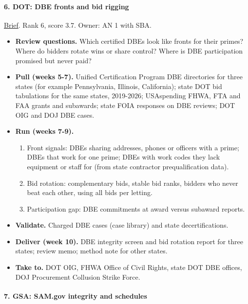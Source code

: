 \documentclass[letterpaper,11pt]{article}
\providecommand{\tightlist}{\setlength{\itemsep}{0pt}\setlength{\parskip}{0pt}}
\begin{document}
\hypertarget{dot-dbe-fronts-and-bid-rigging}{%
\paragraph{6. DOT: DBE fronts and bid
rigging}\label{dot-dbe-fronts-and-bid-rigging}}

\href{agencies/dot.pdf}{Brief}. Rank 6, score 3.7. Owner: AN 1 with SBA.

\begin{itemize}
\tightlist
\item
  \textbf{Review questions.} Which certified DBEs look like fronts for
  their primes? Where do bidders rotate wins or share control? Where is
  DBE participation promised but never paid?
\item
  \textbf{Pull (weeks 5-7).} Unified Certification Program DBE
  directories for three states (for example Pennsylvania, Illinois,
  California); state DOT bid tabulations for the same states, 2019-2026;
  USAspending FHWA, FTA and FAA grants and subawards; state FOIA
  responses on DBE reviews; DOT OIG and DOJ DBE cases.
\item
  \textbf{Run (weeks 7-9).}

  \begin{enumerate}
  \def\labelenumi{\arabic{enumi}.}
  \tightlist
  \item
    Front signals: DBEs sharing addresses, phones or officers with a
    prime; DBEs that work for one prime; DBEs with work codes they lack
    equipment or staff for (from state contractor prequalification
    data).
  \item
    Bid rotation: complementary bids, stable bid ranks, bidders who
    never beat each other, using all bids per letting.
  \item
    Participation gap: DBE commitments at award versus subaward reports.
  \end{enumerate}
\item
  \textbf{Validate.} Charged DBE cases (case library) and state
  decertifications.
\item
  \textbf{Deliver (week 10).} DBE integrity screen and bid rotation
  report for three states; review memo; method note for other states.
\item
  \textbf{Take to.} DOT OIG, FHWA Office of Civil Rights, state DOT DBE
  offices, DOJ Procurement Collusion Strike Force.
\end{itemize}

\hypertarget{gsa-sam.gov-integrity-and-schedules}{%
\paragraph{7. GSA: SAM.gov integrity and
schedules}\label{gsa-sam.gov-integrity-and-schedules}}
\end{document}
